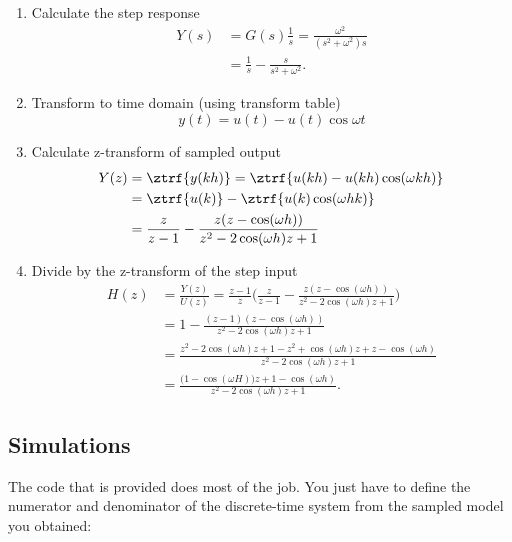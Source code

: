 \documentclass{scrartcl}
\begin{document}
\begin{enumerate}
\item Calculate the step response
      \begin{equation*}
       \begin{split} 
         Y(s) &= G(s)\frac{1}{s} = \frac{\omega^2}{(s^2 + \omega^2)s}\\
              &= \frac{1}{s} - \frac{s}{s^2 + \omega^2}.
       \end{split}
      \end{equation*}
\item Transform to time domain (using transform table) 
      \[ y(t) = u(t) - u(t) \cos \omega t \]
\item Calculate z-transform of sampled output 
      \begin{equation*}
       \begin{split} 
        Y(z) &= \ztrf{y(kh)} = \ztrf{u(kh) - u(kh)\cos(\omega k h)}\\
             &= \ztrf{u(k)} - \ztrf{u(k)\cos(\omega hk)}\\
             &= \frac{z}{z-1} - \frac{z(z-\cos(\omega h))}{z^2 -2\cos(\omega h)z +1}
       \end{split}
      \end{equation*}
\item Divide by the z-transform of the step input
       \begin{equation*}
        \begin{split}
         H(z) &= \frac{Y(z)}{U(z)} = \frac{z-1}{z} \Big( \frac{z}{z-1} - \frac{z(z-\cos(\omega h))}{z^2 -2\cos(\omega h)z +1}\Big)\\
              &= 1 - \frac{(z-1)(z-\cos(\omega h))}{z^2 -2\cos(\omega h)z +1}\\
              &= \frac{z^2 - 2\cos(\omega h)z + 1 - z^2 +\cos(\omega h)z + z - \cos(\omega h)}{z^2 - 2\cos(\omega h)z + 1}\\
              &= \frac{\big(1-\cos(\omega H)\big)z + 1-\cos(\omega h)}{z^2 - 2\cos(\omega h)z + 1}.
        \end{split}
       \end{equation*}
\end{enumerate}
\subsection*{Simulations}
\label{sec-2-2}

   The code that is provided does most of the job. You just have to define the numerator and denominator of the discrete-time system from the sampled model you obtained:
\end{document}
